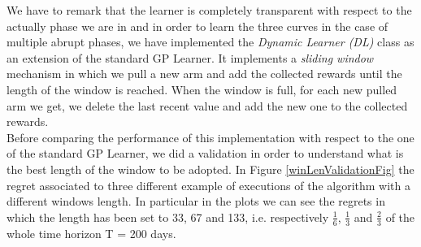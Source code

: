 We have to remark that the learner is completely transparent with respect to the actually phase we are in and in order to learn the three curves in the case of multiple abrupt phases, we have implemented the \textit{Dynamic Learner (DL)} class as an extension of the standard GP Learner.
It implements a \textit{sliding window} mechanism in which we pull a new arm and add the collected rewards until the length of the window is reached. When the window is full, for each new pulled arm we get, we delete the last recent value and add the new one to the collected rewards.\\ Before comparing the performance of this implementation with respect to the one of the standard GP Learner, we did a validation in order to understand what is the best length of the window to be adopted. In Figure \ref{winLenValidationFig} the regret associated to three different example of executions of the algorithm with a different windows length. In particular in the plots we can see the regrets in which the length has been set to 33, 67 and 133, i.e. respectively $\frac{1}{6}$, $\frac{1}{3}$ and $\frac{2}{3}$ of the whole time horizon T = 200 days.
